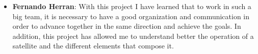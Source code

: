 {\begin{itemize}
 
\item \textbf{Fernando Herran}: With this project I have learned that to work in such a big team, it is necessary to have a good organization and communication in order to advance together in the same direction and  achieve the goals. In addition, this project has allowed me to understand better the operation of a satellite and the different elements that compose it.
\end{itemize}
}



